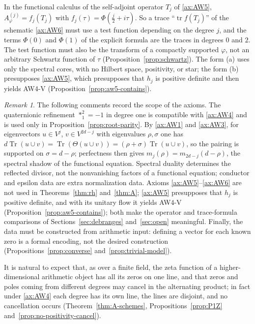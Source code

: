 \documentclass[11pt]{amsart}
\theoremstyle{plain}
\theoremstyle{definition}
\theoremstyle{remark}
\newtheorem{remark}[theorem]{Remark}
\numberwithin{equation}{section}
\DeclareMathOperator{\Tr}{Tr}
\DeclareMathOperator{\tr}{tr}
\begin{document}
In the functional calculus of the self-adjoint operator $T_j$ of
\ref{ax:AW5}, $A^{(j)}_\varphi=f_j(T_j)$ with
$f_j(\tau)=\Phi(\tfrac j2+i\tau)$. So a trace ``$\tr f(T_j)$'' of the
schematic \ref{ax:AW6} must use a test function depending on the degree
$j$, and the terms $\Phi(0)$ and $\Phi(1)$ of the explicit formula are
the traces in degrees $0$ and $2$. The test function must also be the
transform of a compactly supported $\varphi$, not an arbitrary Schwartz
function of $\tau$ (Proposition~\ref{prop:schwartz}). The form (a) uses
only the spectral cores, with no Hilbert space, positivity, or star; the
form (b) presupposes \ref{ax:AW5}, which presupposes that $h_j$ is
positive definite and then yields AW4-V
(Proposition~\ref{prop:aw5-contains}).
\begin{remark}\label{rem:aw-comments}
The following comments record the scope of the axioms. The
quaternionic refinement $*_1^2=-1$ in degree one
\cite[2.7, p.~3]{Deninger2022NoWeil} is compatible with
\ref{ax:AW4} and is used only in Proposition~\ref{prop:root-parity}. By
\ref{ax:AW1} and \ref{ax:AW3}, for eigenvectors $u\in V^j$, $v\in
V^{2d-j}$ with eigenvalues $\rho,\sigma$ one has
$d\Tr(u\cup v)=\Tr(\Theta(u\cup v))=(\rho+\sigma)\Tr(u\cup v)$, so
the pairing is supported on $\sigma=d-\rho$; perfectness then gives
$m_j(\rho)=m_{2d-j}(d-\rho)$, the spectral shadow of the functional
equation. Spectral duality determines the reflected divisor, not the
nonvanishing factors of a functional equation; conductor and epsilon
data are extra normalization data. Axioms \ref{ax:AW5}--\ref{ax:AW6}
are not used in Theorems~\ref{thm:rh} and~\ref{thm:A};
\ref{ax:AW5} presupposes that $h_j$ is positive definite, and with its
unitary flow it yields AW4-V (Proposition~\ref{prop:aw5-contains});
both make the operator and
trace-formula comparisons of Sections~\ref{sec:debranges}
and~\ref{sec:open} meaningful. Finally, the data must be constructed
from arithmetic input: defining a vector for each known zero is a formal
encoding, not the desired construction
(Propositions~\ref{prop:converse} and~\ref{prop:trivial-model}).
\end{remark}

It is natural to expect that, as over a finite field, the zeta
function of a higher-dimensional arithmetic object has all its zeros on
one line, and that zeros and poles coming from different degrees may
cancel in the alternating product; in fact under \ref{ax:AW4} each
degree has its own line, the lines are disjoint, and no cancellation
occurs (Theorem~\ref{thm:A-schemes},
Propositions~\ref{prop:P1Z} and~\ref{prop:no-positivity-cancel}).
\end{document}
